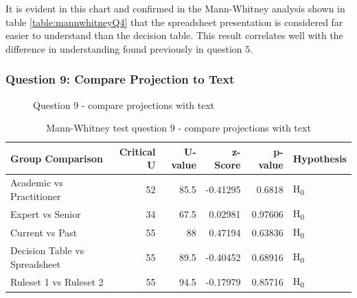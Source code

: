 It is evident in this chart and confirmed in the Mann-Whitney analysis shown in table \ref{table:mannwhitneyQ4} that the spreadsheet presentation is considered far easier to understand than the decision table.
This result correlates well with the difference in understanding found previously in question 5.


\subsubsection{Question 9: Compare Projection to Text}

\begin{figure}[H]
    \centering
    \caption{Question 9 - compare projections with text}
    \label{fig:stackedbar_Q5}
\end{figure}

\begin{table}[H]
    \begin{center}
        \begin{tabular}{ |l ||r |r |r | r|l | } 
            \hline
            Group Comparison                 & Critical U & U-value & z-Score  & p-value & Hypothesis         \\
            \hline
            \hline
            Academic vs Practitioner         & 52         & 85.5    & -0.41295 & 0.6818  & H\textsubscript{0} \\ 
            \hline
            Expert vs Senior                 & 34         & 67.5    & 0.02981  & 0.97606 & H\textsubscript{0} \\ 
            \hline
            Current vs Past                  & 55         & 88      & 0.47194  & 0.63836 & H\textsubscript{0} \\ 
            \hline
            Decision Table vs Spreadsheet    & 55         & 89.5    & -0.40452 & 0.68916 & H\textsubscript{0} \\ 
            \hline
            Ruleset 1 vs Ruleset 2           & 55         & 94.5    & -0.17979 & 0.85716 & H\textsubscript{0} \\ 
            \hline
        \end{tabular}
    \end{center}
    \caption{Mann-Whitney test question 9 - compare projections with text}
    \label{table:mannwhitneyQ5}
\end{table}

